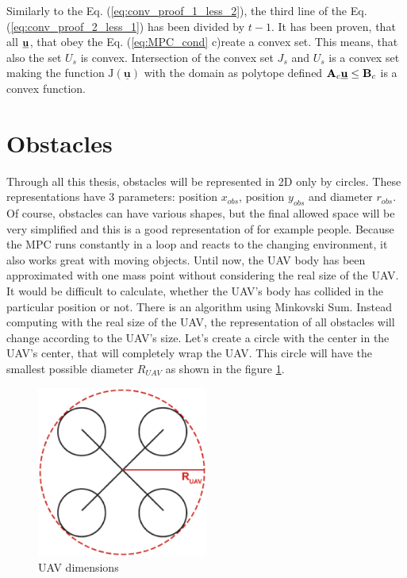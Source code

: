 \documentclass[a4paper,11pt,titlepage]{article}
\newcommand{\uvec}{\textbf{\underline{u}}}
\begin{document}
Similarly to the Eq. (\ref{eq:conv_proof_1_less_2}), the third line of the Eq. (\ref{eq:conv_proof_2_less_1}) has been divided by $t-1$. 
It has been proven, that all $\uvec$, that obey the Eq. (\ref{eq:MPC_cond} c)reate a convex set. This means, that also the set $U_s$ is convex. Intersection of the convex set $J_s$ and $U_s$ is a convex set making the function $\mathrm{J}(\underline{\textbf{u}})$ with the domain as polytope defined $\textbf{A}_c \uvec \leq \textbf{B}_c$ is a convex function.

\section{Obstacles}
Through all this thesis, obstacles will be represented in 2D only by circles. These representations have 3 parameters: position $x_{obs}$, position $y_{obs}$ and diameter $r_{obs}$. Of course, obstacles can have various shapes, but the final allowed space will be very simplified and this is a good representation of for example people. Because the MPC runs constantly in a loop and reacts to the changing environment, it also works great with moving objects. Until now, the UAV body has been approximated with one mass point without considering the real size of the UAV. It would be difficult to calculate, whether the UAV's body has collided in the particular position or not. There is an algorithm using Minkovski Sum. Instead computing with the real size of the UAV, the representation of all obstacles will change according to the UAV's size.
Let's create a circle with the center in the UAV's center, that will completely wrap the UAV. This circle will have the smallest possible diameter $R_{UAV}$ as shown in the figure \ref{fig:UAV_dimensions}. 

\begin{figure}[h]
\begin{center}
\includegraphics[width=0.5\textwidth]{fig/UAV_dimensions.eps} 
\caption{UAV dimensions}
\label{fig:UAV_dimensions}
\end{center}
\end{figure}
\end{document}
